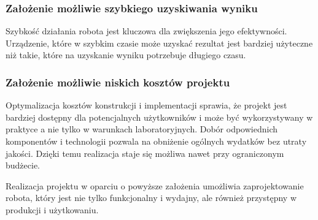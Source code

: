 \subsubsection{Założenie możliwie szybkiego uzyskiwania wyniku}
Szybkość działania robota jest kluczowa dla zwiększenia jego efektywności. Urządzenie, które w szybkim czasie może uzyskać rezultat jest bardziej użyteczne niż 
takie, które na uzyskanie wyniku potrzebuje długiego czasu. 

\subsubsection{Założenie możliwie niskich kosztów projektu}
Optymalizacja kosztów konstrukcji i implementacji sprawia, że projekt jest bardziej dostępny dla potencjalnych użytkowników i może być wykorzystywany w praktyce a nie tylko w warunkach laboratoryjnych. 
Dobór odpowiednich komponentów i technologii pozwala na obniżenie ogólnych wydatków bez utraty jakości. Dzięki temu realizacja 
staje się możliwa nawet przy ograniczonym budżecie.

Realizacja projektu w oparciu o powyższe założenia umożliwia zaprojektowanie robota, który jest nie tylko funkcjonalny i wydajny, ale również przystępny w produkcji i 
użytkowaniu.
